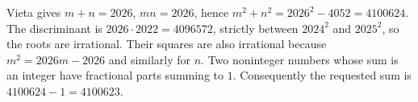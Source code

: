 Vieta gives $m+n=2026$, $mn=2026$, hence $m^2+n^2=2026^2-4052=4100624$. The discriminant is $2026\cdot 2022=4096572$, strictly between $2024^2$ and $2025^2$, so the roots are irrational. Their squares are also irrational because $m^2=2026m-2026$ and similarly for $n$. Two noninteger numbers whose sum is an integer have fractional parts summing to $1$. Consequently the requested sum is $4100624-1=\boxed{4100623}$.
